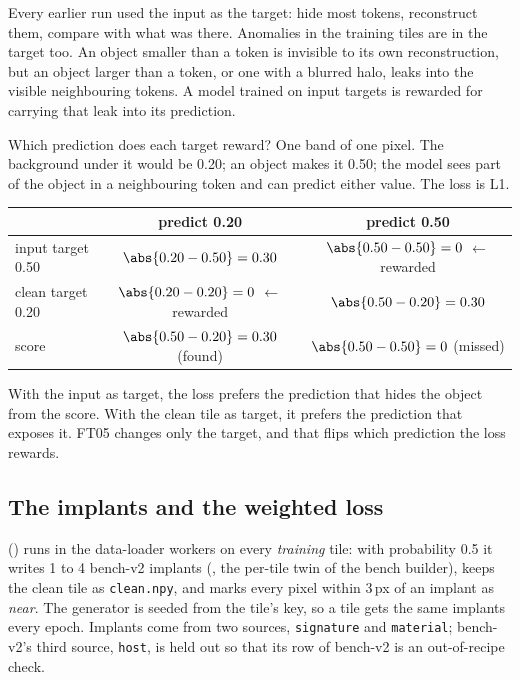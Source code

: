 Every earlier run used the input as the target: hide most tokens, reconstruct them, compare with what was there.
Anomalies in the training tiles are in the target too. An object smaller than a token is invisible to its own
reconstruction, but an object larger than a token, or one with a blurred halo, leaks into the visible neighbouring
tokens. A model trained on input targets is rewarded for carrying that leak into its prediction.

\begin{worked}[label={we:ftruns:denoise}]{Which prediction does each target reward?}
One band of one pixel. The background under it would be 0.20; an object makes it 0.50; the model sees part of the
object in a neighbouring token and can predict either value. The loss is L1.
\begin{center}
\begin{tabular}{lcc}
\toprule
 & predict 0.20 & predict 0.50 \\
\midrule
input target 0.50 & $\abs{0.20 - 0.50} = 0.30$ & $\abs{0.50 - 0.50} = 0$ $\leftarrow$ rewarded \\
clean target 0.20 & $\abs{0.20 - 0.20} = 0$ $\leftarrow$ rewarded & $\abs{0.50 - 0.20} = 0.30$ \\
score &$\abs{0.50 - 0.20} = 0.30$ (found) & $\abs{0.50 - 0.50} = 0$ (missed) \\
\bottomrule
\end{tabular}
\end{center}
With the input as target, the loss prefers the prediction that hides the object from the score. With the clean tile
as target, it prefers the prediction that exposes it. FT05 changes only the target, and that flips which prediction the
loss rewards.
\end{worked}

\subsection{The implants and the weighted loss}

 () runs in the data-loader workers on
every \emph{training} tile: with probability 0.5 it writes 1 to 4 bench-v2 implants (, the per-tile
twin of the bench builder), keeps the clean tile as \texttt{clean.npy}, and marks every pixel within 3\,px of an
implant as \emph{near}. The generator is seeded from the tile's key, so a tile gets the same implants every epoch.
Implants come from two sources, \texttt{signature} and \texttt{material}; bench-v2's third source, \texttt{host}, is
held out so that its row of bench-v2 is an out-of-recipe check.


